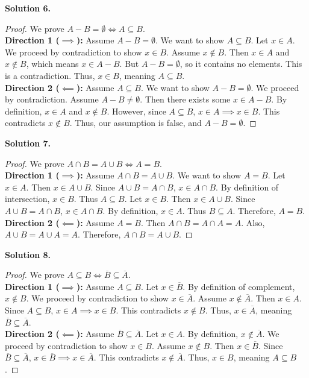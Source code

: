 \documentclass[11pt]{article}
\begin{document}
\noindent \textbf{Solution 6.}
\begin{proof}
We prove $A - B = \emptyset \iff A \subseteq B$. \\
\textbf{Direction 1 ($\implies$):} Assume $A - B = \emptyset$. We want to show $A \subseteq B$. Let $x \in A$. We proceed by contradiction to show $x \in B$. Assume $x \notin B$. Then $x \in A$ and $x \notin B$, which means $x \in A - B$. But $A - B = \emptyset$, so it contains no elements. This is a contradiction. Thus, $x \in B$, meaning $A \subseteq B$. \\
\textbf{Direction 2 ($\impliedby$):} Assume $A \subseteq B$. We want to show $A - B = \emptyset$. We proceed by contradiction. Assume $A - B \neq \emptyset$. Then there exists some $x \in A - B$. By definition, $x \in A$ and $x \notin B$. However, since $A \subseteq B$, $x \in A \implies x \in B$. This contradicts $x \notin B$. Thus, our assumption is false, and $A - B = \emptyset$.
\end{proof}

\noindent \textbf{Solution 7.}
\begin{proof}
We prove $A \cap B = A \cup B \iff A = B$. \\
\textbf{Direction 1 ($\implies$):} Assume $A \cap B = A \cup B$. We want to show $A = B$. 
Let $x \in A$. Then $x \in A \cup B$. Since $A \cup B = A \cap B$, $x \in A \cap B$. By definition of intersection, $x \in B$. Thus $A \subseteq B$. 
Let $x \in B$. Then $x \in A \cup B$. Since $A \cup B = A \cap B$, $x \in A \cap B$. By definition, $x \in A$. Thus $B \subseteq A$. 
Therefore, $A = B$. \\
\textbf{Direction 2 ($\impliedby$):} Assume $A = B$. Then $A \cap B = A \cap A = A$. Also, $A \cup B = A \cup A = A$. Therefore, $A \cap B = A \cup B$.
\end{proof}

\noindent \textbf{Solution 8.}
\begin{proof}
We prove $A \subseteq B \iff \overline{B} \subseteq \overline{A}$. \\
\textbf{Direction 1 ($\implies$):} Assume $A \subseteq B$. Let $x \in \overline{B}$. By definition of complement, $x \notin B$. We proceed by contradiction to show $x \in \overline{A}$. Assume $x \notin \overline{A}$. Then $x \in A$. Since $A \subseteq B$, $x \in A \implies x \in B$. This contradicts $x \notin B$. Thus, $x \in \overline{A}$, meaning $\overline{B} \subseteq \overline{A}$. \\
\textbf{Direction 2 ($\impliedby$):} Assume $\overline{B} \subseteq \overline{A}$. Let $x \in A$. By definition, $x \notin \overline{A}$. We proceed by contradiction to show $x \in B$. Assume $x \notin B$. Then $x \in \overline{B}$. Since $\overline{B} \subseteq \overline{A}$, $x \in \overline{B} \implies x \in \overline{A}$. This contradicts $x \notin \overline{A}$. Thus, $x \in B$, meaning $A \subseteq B$.
\end{proof}
\end{document}
